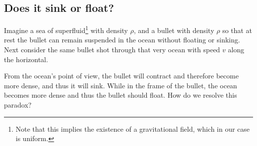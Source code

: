 \subsection{Does it sink or float?}
	Imagine a sea of superfluid\footnote{Note that this implies the existence of 
	a gravitational field, which in our case is uniform.} with density $\rho$,
	 and a bullet with density $\rho$ so that at rest the bullet can remain 
	suspended in the ocean without floating or sinking. Next consider the same 
	bullet shot through that very ocean with speed $v$ along the horizontal.

	From the ocean's point of view, the bullet will contract and therefore 
	become more dense, and thus it will sink. While in the frame of the bullet, 
	the ocean becomes more dense and thus the bullet should float. How do we
	resolve this paradox?\\
	\hspace*{15pt}{\scriptsize Credit: Elan Stopnitzky}